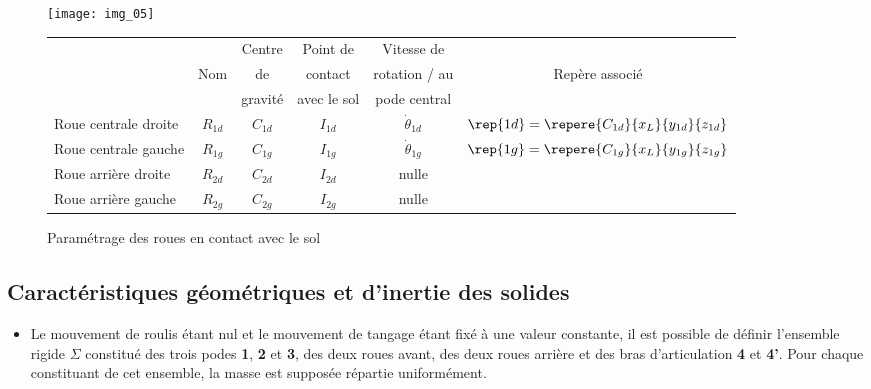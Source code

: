 \begin{figure}[H]
\centering
\texttt{[image: img\_05]}

\vspace{.5cm}

\begin{tabular}{lccccc}
\hline
&  & Centre & Point de & Vitesse de &  \\
&    Nom     &de         & contact  & rotation / au & Repère associé \\
&        & gravité & avec le sol & pode central & \\ \hline\hline
Roue centrale droite & $R_{1d}$ & $C_{1d}$ & $I_{1d}$ & $\dot{\theta}_{1d}$ & $\rep{1d}=\repere{C_{1d}}{x_L}{y_{1d}}{z_{1d}}$ \\ \hline
Roue centrale gauche & $R_{1g}$ & $C_{1g}$ & $I_{1g}$ & $\dot{\theta}_{1g}$ & $\rep{1g}=\repere{C_{1g}}{x_L}{y_{1g}}{z_{1g}}$ \\ \hline
Roue arrière droite & $R_{2d}$ & $C_{2d}$ & $I_{2d}$ & nulle &  \\ \hline
Roue arrière gauche & $R_{2g}$ & $C_{2g}$ & $I_{2g}$ & nulle &\\ \hline
\end{tabular}

\caption{Paramétrage des roues en contact avec le sol \label{img:05}}
\end{figure}

\subsection*{Caractéristiques géométriques et d’inertie des solides}

\begin{itemize}
\item Le mouvement de roulis étant nul et le mouvement de tangage étant fixé à une valeur constante, il est possible de définir l’ensemble rigide $\Sigma$ constitué des trois podes \textbf{1}, \textbf{2} et \textbf{3}, des deux roues avant, des deux roues arrière et des bras d’articulation \textbf{4} et \textbf{4’}. Pour chaque constituant de cet ensemble, la masse est supposée répartie uniformément.
\end{itemize}

